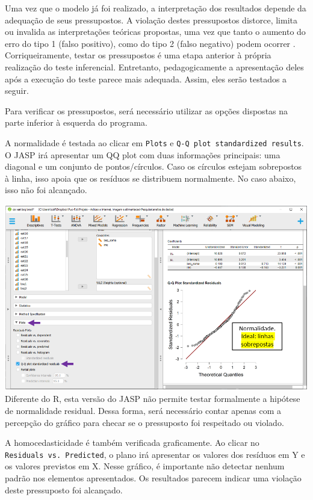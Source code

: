 \documentclass[
]{book}
\begin{document}
Uma vez que o modelo já foi realizado, a interpretação dos resultados depende da adequação de seus pressupostos. A violação destes pressupostos distorce, limita ou invalida as interpretações teóricas propostas, uma vez que tanto o aumento do erro do tipo 1 (falso positivo), como do tipo 2 (falso negativo) podem ocorrer \citep{Lix1996, Barker2015, Ernst2017}. Corriqueiramente, testar os pressupostos é uma etapa anterior à própria realização do teste inferencial. Entretanto, pedagogicamente a apresentação deles após a execução do teste parece mais adequada. Assim, eles serão testados a seguir.

Para verificar os pressupostos, será necessário utilizar as opções dispostas na parte inferior à esquerda do programa.

A normalidade é testada ao clicar em \texttt{Plots} e \texttt{Q-Q\ plot\ standardized\ results}. O JASP irá apresentar um QQ plot com duas informações principais: uma diagonal e um conjunto de pontos/círculos. Caso os círculos estejam sobrepostos à linha, isso apoia que os resíduos se distribuem normalmente. No caso abaixo, isso não foi alcançado.

\includegraphics{./img/cap_reg_multipla_normalidade.png}
Diferente do R, esta versão do JASP não permite testar formalmente a hipótese de normalidade residual. Dessa forma, será necessário contar apenas com a percepção do gráfico para checar se o pressuposto foi respeitado ou violado.

A homocedasticidade é também verificada graficamente. Ao clicar no \texttt{Residuals\ vs.\ Predicted}, o plano irá apresentar os valores dos resíduos em Y e os valores previstos em X. Nesse gráfico, é importante não detectar nenhum padrão nos elementos apresentados. Os resultados parecem indicar uma violação deste pressuposto foi alcançado.
\end{document}
